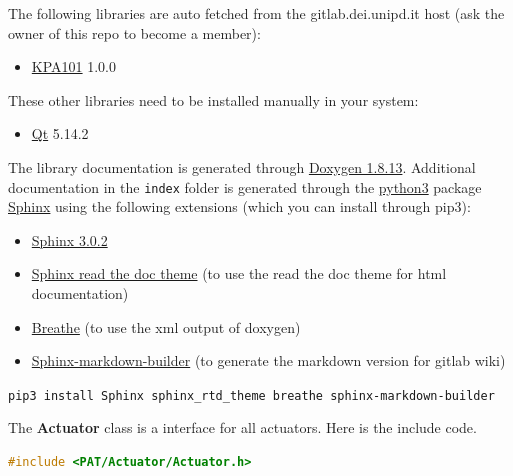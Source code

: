 
The following libraries are auto fetched from the gitlab.dei.unipd.it
host (ask the owner of this repo to become a member):

\begin{itemize}
  \tightlist
  \item
        \href{https://gitlab.dei.unipd.it/PAT/KPA101.git}{KPA101} 1.0.0
\end{itemize}

These other libraries need to be installed manually in your system:

\begin{itemize}
  \tightlist
  \item
        \href{https://www.qt.io/}{Qt} 5.14.2
\end{itemize}

The library documentation is generated through
\href{http://www.doxygen.nl/download.html}{Doxygen 1.8.13}. Additional
documentation in the \texttt{index} folder is generated through the
\href{https://www.anaconda.com/products/individual}{python3} package
\href{https://www.sphinx-doc.org/en/master/}{Sphinx} using the following
extensions (which you can install through pip3):

\begin{itemize}
  \tightlist
  \item
        \href{https://pypi.org/project/Sphinx/}{Sphinx 3.0.2}
  \item
        \href{https://sphinx-rtd-theme.readthedocs.io/en/stable/}{Sphinx read
          the doc theme} (to use the read the doc theme for html documentation)
  \item
        \href{https://pypi.org/project/breathe/}{Breathe} (to use the xml
        output of doxygen)
  \item
        \href{https://pypi.org/project/sphinx-markdown-builder/}{Sphinx-markdown-builder}
        (to generate the markdown version for gitlab wiki)
\end{itemize}

\texttt{pip3\ install\ Sphinx\ sphinx\_rtd\_theme\ breathe\ sphinx-markdown-builder}



The \textbf{Actuator} class is a interface for all actuators. Here is the
include code.

\begin{lstlisting}[language=c++, gobble=2]
  #include <PAT/Actuator/Actuator.h>
\end{lstlisting}

